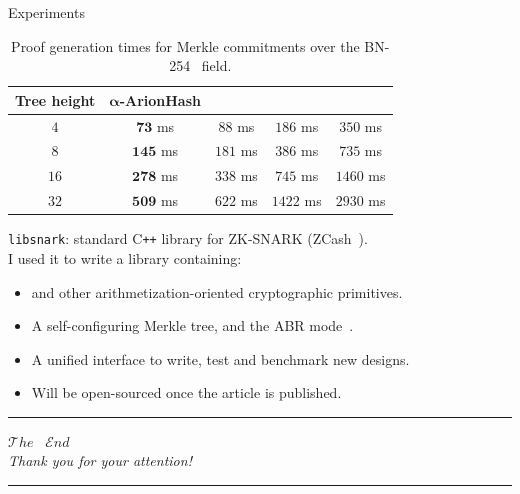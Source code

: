 \documentclass[beamer={10pt,xcolor=dvipsnames},target=mst]{thud}
\begin{document}
\begin{frame}{Experiments}
  \begin{table}
    \centering
    \caption*{Proof generation times for Merkle commitments over the BN-254~\cite{BarretoN2005} field.}
        \begin{tabular}{c | c c c c}  
          \toprule
          Tree height & \(\bm{\alpha}\)\textbf{-ArionHash} & \Griffin{} & \Poseidon{} & \Mimc{} \\
          \midrule
          \(4\)   & \(\bm{73}\) ms  & \(88\) ms & \(186\) ms   & \(350\)  ms \\
          \(8\)   & \(\bm{145}\) ms & \(181\) ms & \(386\) ms  & \(735\)  ms \\
          \(16\)  & \(\bm{278}\) ms & \(338\) ms & \(745\) ms  & \(1460\) ms \\
          \(32\)  & \(\bm{509}\) ms & \(622\) ms & \(1422\) ms & \(2930\) ms \\
          \bottomrule
        \end{tabular}
  \end{table}
  \vspace*{16pt}
  \texttt{libsnark}: standard C\texttt{++} library for ZK-SNARK (ZCash~\cite{SassonCGGMTV2014}).\\
  I used it to write a library containing:
  \begin{itemize}
    \item \Arion{} and other arithmetization-oriented cryptographic primitives.
    \item A self-configuring Merkle tree, and the ABR mode~\cite{AndreevaBR2021}.
    \item A unified interface to write, test and benchmark new designs.
    \item Will be open-sourced once the article is published.
  \end{itemize}
\end{frame}

\begin{frame}
  \begin{center}
    \rule{\textwidth}{0.5pt}
    \huge{\(\mathcal{T}\mathit{he}\)} \ \huge{\(\mathcal{E}\mathit{nd}\)}\\
    \Large{\emph{Thank you for your attention!}}
    \rule{\textwidth}{0.5pt}
  \end{center}
\end{frame}
\end{document}
